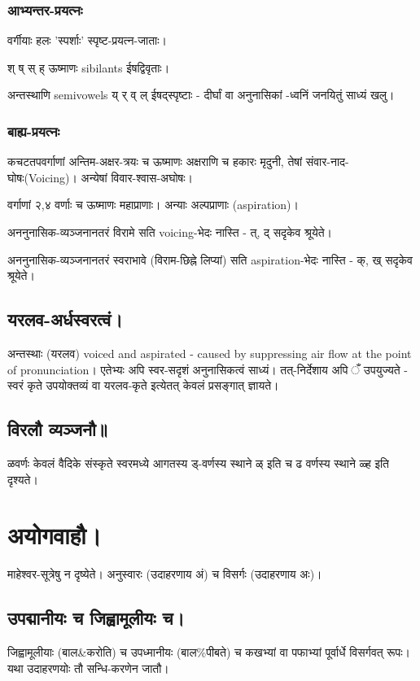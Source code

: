 \documentclass[oneside, article]{memoir}
\begin{document}
\subsubsection{आभ्यन्तर-प्रयत्नः}
वर्गीयाः हलः 'स्पर्शाः' स्पृष्ट-प्रयत्न-जाताः।

श् ष् स् ह् ऊष्माणः sibilants ईषद्विवृताः।

अन्तस्थाणि semivowels य् र् व् ल् ईषद्स्पृष्टाः - दीर्घां वा अनुनासिकां -ध्वनिं जनयितुं साध्यं खलु।

\subsubsection{बाह्य-प्रयत्नः}
कचटतपवर्गाणां अन्तिम-अक्षर-त्रयः च ऊष्माणः अक्षराणि च हकारः‌ मृदुनी, तेषां संवार-नाद-घोषः(Voicing)। अन्येषां विवार-श्वास-अघोषः।

वर्गाणां २,४ वर्णाः च ऊष्माणः महाप्राणाः। अन्याः अल्पप्राणाः (aspiration)।

अननुनासिक-व्यञ्जनानतरं विरामे सति voicing-भेदः नास्ति - त्, द् सदृकेव श्रूयेते।

अननुनासिक-व्यञ्जनानतरं स्वराभावे (विराम-छिह्ने लिप्यां) सति aspiration-भेदः नास्ति - क्, ख् सदृकेव श्रूयेते।

\subsection{यरलव-अर्धस्वरत्वं। }
अन्तस्थाः (यरलव) voiced and aspirated - caused by suppressing air flow at the point of pronunciation। एतेभ्यः अपि स्वर-सदृशं‌ अनुनासिकत्वं साध्यं। तत्-निर्देशाय अपि ँ उपयुज्यते - स्वरं कृते उपयोक्तव्यं वा यरलव-कृते इत्येतत् केवलं प्रसङ्गात् ज्ञायते।

\subsection{विरलौ व्यञ्जनौ॥}
ळवर्णः केवलं वैदिके संस्कृते स्वरमध्ये आगतस्य ड्-वर्णस्य स्थाने ळ् इति च ढ वर्णस्य स्थाने ळ्ह इति दृश्यते।

\section{अयोगवाहौ।}
माहेश्वर-सूत्रेषु न दृष्येते। अनुस्वारः (उदाहरणाय अं) च विसर्गः (उदाहरणाय अः)।

\subsection{उपद्मानीयः च जिह्वामूलीयः च।}
जिह्वामूलीयाः (बाल\&करोति) च उपध्मानीयः (बाल\%पीबते) च कखभ्यां वा पफाभ्यां पूर्वार्धे विसर्गवत् रूपः। यथा उदाहरणयोः तौ सन्धि-करणेन जातौ।
\end{document}
